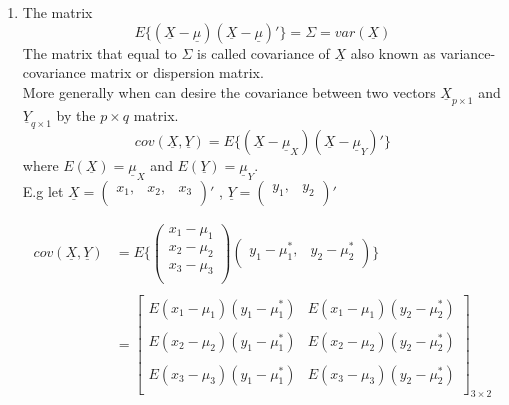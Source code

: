 \documentclass[11pt,a4paper]{article}
\theoremstyle{definition}
\begin{document}
\begin{enumerate}
\begin{enumerate}
         \item The matrix $$E\big\{(\underline{X}-\underline{\mu})(\underline{X}-\underline{\mu})'\big\} = \Sigma = var(\underline{X})$$
The matrix that equal to $\displaystyle{\Sigma}$ is called covariance of $\underline{X}$ also known as variance-covariance matrix or dispersion matrix.\\ More generally when can desire the covariance between two vectors $\underline{X}_{p\times 1}$ and $\underline{Y}_{q\times 1}$ by the $p \times q$ matrix.
$$cov(\underline{X}, \underline{Y}) = E\big\{(\underline{X}-\underline{\mu}_X)(\underline{X}-\underline{\mu}_Y)'\big\}$$ where $E(\underline{X}) = \underline{\mu}_X$ and $E(\underline{Y}) = \underline{\mu}_Y$.\\

E.g let $\underline{X} = \begin{pmatrix}
x_1, & x_2, & x_3\\
\end{pmatrix}'$ , $\underline{Y}= \begin{pmatrix}
y_1, & y_2\\
\end{pmatrix}'$

\begin{align*}
cov ( \underline{X},\underline{Y}) & = E\Bigg\{\begin{pmatrix}
x_1 - \mu_1\\
x_2 - \mu_2\\
x_3 - \mu_3\\
\end{pmatrix}
\begin{pmatrix}
y_1 - \mu^*_1, & y_2 - \mu^*_2\\
\end{pmatrix}
\Bigg\}\\\\
&= \begin{bmatrix}
E ( x_1-\mu_1) ( y_1 - \mu^*_1) & E (x_1-\mu_1) (y_2 - \mu^*_2)\\\\
E (x_2 - \mu_2) (y_1 - \mu^*_1) & E (x_2-\mu_2) (y_2 - \mu^*_2)\\\\
E (x_3 - \mu_3) (y_1 - \mu^*_1) & E (x_3-\mu_3) (y_2- \mu^*_2)\\
\end{bmatrix}_{3\times 2}\\
\end{align*}
\end{enumerate}


\end{enumerate}
\end{document}
